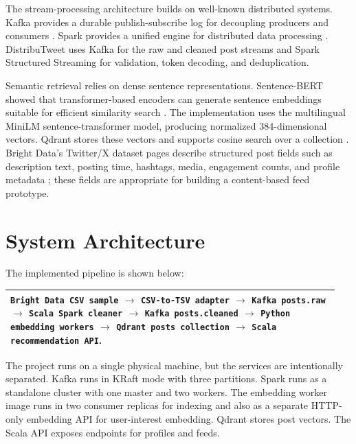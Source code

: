 \documentclass[conference]{IEEEtran}
\begin{document}
The stream-processing architecture builds on well-known distributed systems. Kafka provides a durable publish-subscribe log for decoupling producers and consumers \cite{kreps2011kafka}. Spark provides a unified engine for distributed data processing \cite{zaharia2016spark}. DistribuTweet uses Kafka for the raw and cleaned post streams and Spark Structured Streaming for validation, token decoding, and deduplication.

Semantic retrieval relies on dense sentence representations. Sentence-BERT showed that transformer-based encoders can generate sentence embeddings suitable for efficient similarity search \cite{reimers2019sentencebert}. The implementation uses the multilingual MiniLM sentence-transformer model, producing normalized 384-dimensional vectors. Qdrant stores these vectors and supports cosine search over a collection \cite{qdrantdocs}. Bright Data's Twitter/X dataset pages describe structured post fields such as description text, posting time, hashtags, media, engagement counts, and profile metadata \cite{brightdataProduct}; these fields are appropriate for building a content-based feed prototype.

\section{System Architecture}
The implemented pipeline is shown below:

\begin{center}
\begin{tabular}{>{\raggedright\arraybackslash}p{0.95\linewidth}}
\toprule
\texttt{Bright Data CSV sample} $\rightarrow$
\texttt{CSV-to-TSV adapter} $\rightarrow$
\texttt{Kafka posts.raw} $\rightarrow$
\texttt{Scala Spark cleaner} $\rightarrow$
\texttt{Kafka posts.cleaned} $\rightarrow$
\texttt{Python embedding workers} $\rightarrow$
\texttt{Qdrant posts collection} $\rightarrow$
\texttt{Scala recommendation API}.\\
\bottomrule
\end{tabular}
\end{center}

The project runs on a single physical machine, but the services are intentionally separated. Kafka runs in KRaft mode with three partitions. Spark runs as a standalone cluster with one master and two workers. The embedding worker image runs in two consumer replicas for indexing and also as a separate HTTP-only embedding API for user-interest embedding. Qdrant stores post vectors. The Scala API exposes endpoints for profiles and feeds.
\end{document}
